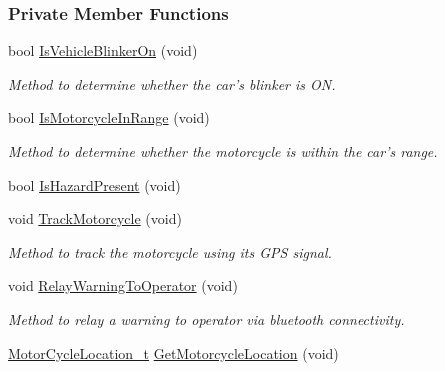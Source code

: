 \subsubsection*{Private Member Functions}
\begin{DoxyCompactItemize}
\item 
bool \hyperlink{classMotorcycleAwarenessSystem_a9c3f98a014b0af39fa120f478eb5f348}{Is\-Vehicle\-Blinker\-On} (void)
\begin{DoxyCompactList}\small\item\em Method to determine whether the car's blinker is O\-N. \end{DoxyCompactList}\item 
bool \hyperlink{classMotorcycleAwarenessSystem_a239655aca9c875b1dbbad3ce155c7892}{Is\-Motorcycle\-In\-Range} (void)
\begin{DoxyCompactList}\small\item\em Method to determine whether the motorcycle is within the car's range. \end{DoxyCompactList}\item 
bool \hyperlink{classMotorcycleAwarenessSystem_a35d59c8299b0d5ef43c10306cc7f2ee1}{Is\-Hazard\-Present} (void)
\item 
void \hyperlink{classMotorcycleAwarenessSystem_a4e6eec23ec46e24ee377a3c94e15eba4}{Track\-Motorcycle} (void)
\begin{DoxyCompactList}\small\item\em Method to track the motorcycle using its G\-P\-S signal. \end{DoxyCompactList}\item 
void \hyperlink{classMotorcycleAwarenessSystem_aec5e4731c6bf0789821ba2793918e3ee}{Relay\-Warning\-To\-Operator} (void)
\begin{DoxyCompactList}\small\item\em Method to relay a warning to operator via bluetooth connectivity. \end{DoxyCompactList}\item 
\hyperlink{structMotorCycleLocation__t}{Motor\-Cycle\-Location\-\_\-t} \hyperlink{classMotorcycleAwarenessSystem_a840a5bc17d75276ecdb3a39d7aaf4109}{Get\-Motorcycle\-Location} (void)
\end{DoxyCompactItemize}
